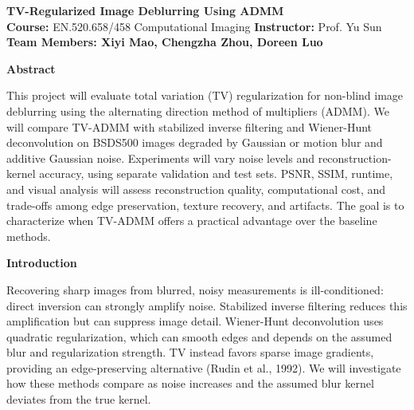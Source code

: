 \documentclass[10pt,letterpaper]{article}
\newcommand{\sectiontitle}[1]{%
  \vspace{2pt}\textcolor{accent}{\fontsize{10.8}{12.2}\selectfont\bfseries #1}\par\vspace{-1pt}%
}
\begin{document}
\begin{center}
  {\fontsize{15.8}{17.6}\selectfont\bfseries TV-Regularized Image Deblurring Using ADMM}\\[5pt]
  \fontsize{7.9}{9.5}\selectfont
  \textbf{Course:} EN.520.658/458 Computational Imaging \quad
  \textbf{Instructor:} Prof. Yu Sun\\[-1pt]
  \textbf{Team Members: Xiyi Mao, Chengzha Zhou, Doreen Luo} 
\end{center}

\fontsize{9.5}{11}\selectfont


\sectiontitle{Abstract}
This project will evaluate total variation (TV) regularization for non-blind image deblurring using the alternating direction method of multipliers (ADMM). We will compare TV-ADMM with stabilized inverse filtering and Wiener-Hunt deconvolution on BSDS500 images degraded by Gaussian or motion blur and additive Gaussian noise. Experiments will vary noise levels and reconstruction-kernel accuracy, using separate validation and test sets. PSNR, SSIM, runtime, and visual analysis will assess reconstruction quality, computational cost, and trade-offs among edge preservation, texture recovery, and artifacts. The goal is to characterize when TV-ADMM offers a practical advantage over the baseline methods.

\sectiontitle{Introduction}
Recovering sharp images from blurred, noisy measurements is ill-conditioned: direct inversion can strongly amplify noise. Stabilized inverse filtering reduces this amplification but can suppress image detail. Wiener-Hunt deconvolution uses quadratic regularization, which can smooth edges and depends on the assumed blur and regularization strength. TV instead favors sparse image gradients, providing an edge-preserving alternative (Rudin et al., 1992). We will investigate how these methods compare as noise increases and the assumed blur kernel deviates from the true kernel.
\end{document}
